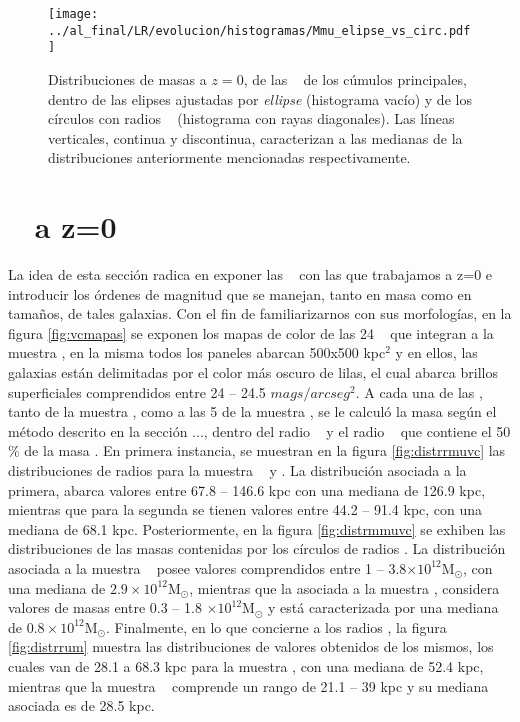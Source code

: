 \begin{figure}[H]
 \centering
 \texttt{[image: ../al\_final/LR/evolucion/histogramas/Mmu\_elipse\_vs\_circ.pdf]}
\caption{Distribuciones de masas a $z=0$, de las \bcgs~ de los c\'umulos principales, dentro de las elipses 
ajustadas por \textit{ellipse} (histograma vac\'io) 
y de los c\'irculos con radios \rvc~ (histograma con rayas diagonales). Las l\'ineas verticales, continua y discontinua,
caracterizan a las medianas de la distribuciones anteriormente mencionadas respectivamente.}
\label{fig:distrelcir}
\end{figure}


\section{\bcgs~ a z=0}
\label{sec:zeta0}

La idea de esta secci\'on radica en exponer las \bcgs~ con las que trabajamos
a z=0 e introducir los \'ordenes de magnitud que se manejan, tanto
en masa como en tama\~nos, de tales galaxias. Con el fin de familiarizarnos
con sus morfolog\'ias, en la figura \ref{fig:vcmapas} se exponen los mapas
de color de las 24 \bcgs~ que integran a la muestra \cmay, en la misma
todos los paneles abarcan 500x500 kpc$^{2}$ y en ellos, las galaxias est\'an delimitadas por el
color m\'as oscuro de lilas, el cual abarca brillos superficiales comprendidos entre
24 -- 24.5 $mags/arcseg^{2}$. A cada una de las \bcgs, tanto de la muestra \cmay, como a
las 5 de la muestra \cmen, se le calcul\'o la masa
seg\'un el m\'etodo descrito en la secci\'on ..., dentro del radio \rvc~ y 
el radio \rum~ que contiene el 50$\%$ de la masa \mvc.
En primera instancia, se muestran en la figura \ref{fig:distrrmuvc}
las distribuciones de radios \rvc para la muestra \cmay~ y \cmen. La distribuci\'on asociada a la 
primera, abarca valores entre
67.8 -- 146.6 kpc con una mediana de 126.9 kpc, mientras que
para la segunda se tienen valores entre 44.2 -- 91.4 kpc, con una mediana de 68.1 kpc.
Posteriormente, en la figura \ref{fig:distrmmuvc} se exhiben las
distribuciones de las masas \mvc contenidas por los c\'irculos de radios \rvc.  
La distribuci\'on asociada a la muestra \cmay~ posee valores comprendidos entre
1 -- 3.8$\times 10^{12}$M$_{\odot}$, con una mediana de 
$2.9\times 10^{12}$M$_{\odot}$, mientras que la asociada a la
muestra \cmen, considera valores de masas entre 
0.3 -- 1.8 $\times 10^{12}$M$_{\odot}$ y est\'a caracterizada por una mediana
de $0.8\times 10^{12}$M$_{\odot}$. Finalmente, en lo que concierne a los radios \rum, la
figura \ref{fig:distrrum} muestra las distribuciones de valores obtenidos de los mismos,
los cuales van de 28.1 a 68.3 kpc para la muestra \cmay, con una mediana de 52.4 kpc,
mientras que la muestra \cmen~ comprende un 
rango de 21.1 -- 39 kpc y su mediana asociada es de 28.5 kpc.


